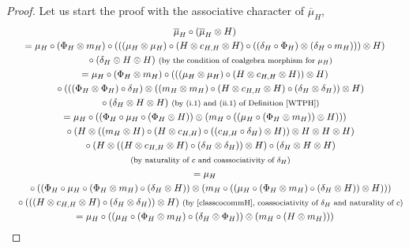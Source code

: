 \documentclass[pdftex]{sigma}
\numberwithin{equation}{section}
\begin{document}
\begin{proof}
Let us start the proof with the associative character of $\overline{\mu}_{H}$,
\begin{gather*}
 \overline{\mu}_{H}\circ (\overline{\mu}_{H}\otimes H )\\
= \mu_{H}\circ (\Phi_{H}\otimes m_{H} ) \circ (((\mu_{H}\otimes\mu_{H})\circ (H\otimes c_{H,H}\otimes H )\circ ((\delta_{H}\circ\Phi_{H})\otimes (\delta_{H}\circ m_{H})))\otimes H)\\
\quad{}\circ (\delta_{H}\otimes H\otimes H )\ \text{\footnotesize\textnormal{(by the condition of coalgebra morphism for $\mu_{H}$)}}\\
= \mu_{H}\circ (\Phi_{H}\otimes m_{H} )\circ ( ( (\mu_{H}\otimes \mu_{H} )\circ (H\otimes c_{H,H}\otimes H ) )\otimes H )\\
\quad{} \circ ( ( (\Phi_{H}\otimes \Phi_{H} )\circ\delta_{H} )\otimes ( (m_{H}\otimes m_{H} )\circ (H\otimes c_{H,H}\otimes H )\circ (\delta_{H}\otimes\delta_{H} ) )\otimes H )\\
\quad{} \circ (\delta_{H}\otimes H\otimes H )\ \text{\footnotesize\textnormal{(by (i.1) and (ii.1) of Definition \ref{WTPH})}}\\
= \mu_{H}\circ ( (\Phi_{H}\circ\mu_{H}\circ (\Phi_{H}\otimes H ) )\otimes (m_{H}\circ ( (\mu_{H}\circ (\Phi_{H}\otimes m_{H} ) )\otimes H ) ) )\\
\quad{} \circ (H\otimes ( (m_{H}\otimes H )\circ (H\otimes c_{H,H} )\circ ( (c_{H,H}\circ\delta_{H} )\otimes H ) )\otimes H\otimes H\otimes H )\\
\quad{} \circ (H\otimes ( (H\otimes c_{H,H}\otimes H )\circ (\delta_{H}\otimes\delta_{H} ) )\otimes H )\circ (\delta_{H}\otimes H\otimes H )\\
\quad{}\, \text{\footnotesize\textnormal{(by naturality of $c$ and coassociativity of $\delta_{H}$)}}\\
= \mu_{H}\\
\quad{}\circ( (\Phi_{H}\circ\mu_{H}\circ (\Phi_{H}\otimes m_{H} )\circ (\delta_{H}\otimes H ) )\otimes(m_{H}\circ( (\mu_{H}\circ (\Phi_{H}\otimes m_{H} )\circ (\delta_{H}\otimes H ) )\otimes H)))\\
\quad{}\circ ( ( (H\otimes c_{H,H}\otimes H )\circ (\delta_{H}\otimes\delta_{H} ) )\otimes H ) \ \text{\footnotesize\textnormal{(by~\eqref{classcocommH}, coassociativity of $\delta_{H}$ and naturality of $c$)}}\\
= \mu_{H}\circ ( (\mu_{H}\circ (\Phi_{H}\otimes m_{H} )\circ (\delta_{H}\otimes \Phi_{H} ) )\otimes (m_{H}\circ (H\otimes m_{H} ) ) )\\

\end{gather*}
\end{proof}
\end{document}
